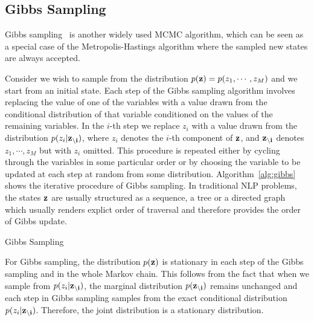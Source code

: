 \subsection{Gibbs Sampling}
Gibbs sampling~\cite{geman1984stochastic} is another widely used MCMC algorithm, which can be seen as a special case of the Metropolis-Hastings algorithm where the sampled new states are always accepted. 


Consider we wish to sample from the distribution $p({\bf z})=p(z_1,\cdots ,z_M)$ and we start from an initial state. Each step of the Gibbs sampling algorithm involves replacing the value of one of the variables 
with a value drawn from the conditional distribution of that variable conditioned on the values of the remaining variables. In the $i$-th step we replace $z_i$ with a value drawn from the distribution $p(z_i|{\bf z_{\setminus i}})$, where $z_i$ denotes the $i$-th component of ${\bf z}$, 
and ${\bf z_{\setminus i}}$ denotes $z_1,\cdots,z_M$ but with $z_i$ omitted. This procedure is repeated either by cycling through the variables
in some particular order or by choosing the variable to be updated at each step at random from some distribution. Algorithm~\ref{alg:gibbs} shows the iterative procedure of Gibbs sampling. In traditional NLP problems, the
states ${\bf z}$ are usually structured as a sequence, a tree or a directed graph which usually renders explict order
of traversal and therefore provides the order of Gibbs update.
\begin{algorithm}[t]
\small
\caption{Gibbs Sampling}
\begin{algorithmic}[1]
\STATE{$\vdots$}
\STATE{$\vdots$}
\ENDFOR
\end{algorithmic}
\label{alg:gibbs}
\end{algorithm}
For Gibbs sampling, the distribution $p({\bf z})$ is stationary in each step of the Gibbs sampling and in the whole Markov chain. This follows from the fact that when we sample from $p(z_i|{\bf z_{\setminus i}})$, the marginal distribution $p({\bf z_{\setminus i}})$ remains unchanged and each step in Gibbs sampling samples from the exact conditional distribution $p(z_i|{\bf z_{\setminus i}})$. Therefore, the joint distribution is a stationary distribution.



